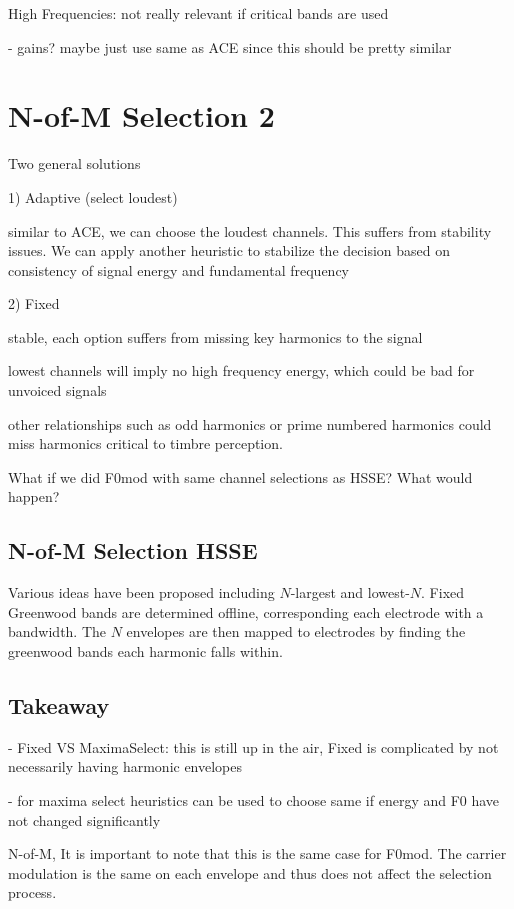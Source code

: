 \documentclass [11pt, proquest] {uwthesis}[2015/03/03]
\begin{document}
High Frequencies: not really relevant if critical bands are used

- gains?  maybe just use same as ACE since this should be pretty similar
 

\section{N-of-M Selection 2}

Two general solutions

1) Adaptive (select loudest)

similar to ACE, we can choose the loudest channels.  This suffers from stability issues.  We can apply another heuristic to stabilize the decision based on consistency of signal energy and fundamental frequency

2) Fixed

stable, each option suffers from missing key harmonics to the signal

lowest channels will imply no high frequency energy, which could be bad for unvoiced signals

other relationships such as odd harmonics or prime numbered harmonics could miss harmonics critical to timbre perception.

What if we did F0mod with same channel selections as HSSE?  What would happen?

\subsection{N-of-M Selection HSSE}

Various ideas have been proposed including $N$-largest and lowest-$N$.  Fixed Greenwood bands are determined offline, corresponding each electrode with a bandwidth.  The $N$ envelopes are then mapped to electrodes by finding the greenwood bands each harmonic falls within.


\subsection{Takeaway}

 - Fixed VS MaximaSelect: this is still up in the air, Fixed is complicated by not necessarily having harmonic envelopes
 
 - for maxima select heuristics can be used to choose same if energy and F0 have not changed significantly
 


N-of-M, It is important to note that this is the same case for F0mod.  The carrier modulation is the same on each envelope and thus does not affect the selection process.
 
\end{document}
